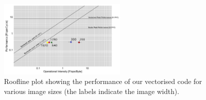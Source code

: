 \begin{figure}\vspace{-6mm}\hspace{-5mm}
  \includegraphics[width=0.55\textwidth]{figures/roofline}
  \caption{Roofline plot showing the performance of our vectorised code for various image sizes (the labels indicate the image width).\label{roofline}}
\end{figure}


